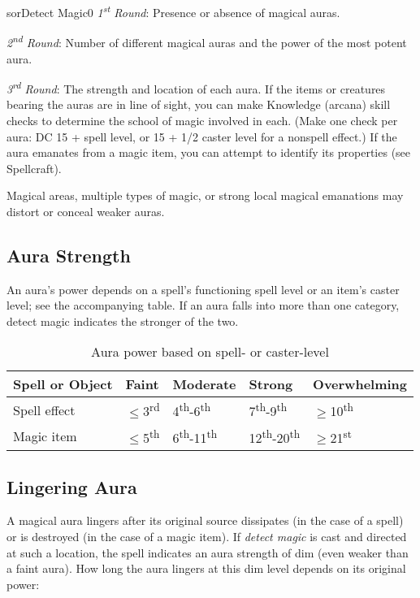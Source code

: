 \begin{spellcard}{sor}{Detect Magic}{0}
  \emph{1\textsuperscript{st} Round}:
  Presence or absence of magical auras.

  \emph{2\textsuperscript{nd} Round}:
  Number of different magical auras and the power of the most potent aura.

  \emph{3\textsuperscript{rd} Round}:
  The strength and location of each aura.
  If the items or creatures bearing the auras are in line of sight,
  you can make Knowledge (arcana) skill checks to determine the school of magic involved in each.
  (Make one check per aura: DC 15 + spell level, or 15 + 1/2 caster level for a nonspell effect.)
  If the aura emanates from a magic item, you can attempt to identify its properties (see Spellcraft).

  Magical areas, multiple types of magic,
  or strong local magical emanations may distort or conceal weaker auras.

  \subsection*{Aura Strength}
  An aura's power depends on a spell's functioning spell level or an item's caster level;
  see the accompanying table.
  If an aura falls into more than one category, detect magic indicates the stronger of the two.

  \begin{longtable}[]{@{}lllll@{}}
    \caption{Aura power based on spell- or caster-level}                                                                                                                                                          \\
    \toprule
    Spell or Object & Faint                           & Moderate                                     & Strong                                        & Overwhelming \tabularnewline\midrule
    \endhead{}
    Spell effect    & \(\leq{}\)3\textsuperscript{rd} & 4\textsuperscript{th}-6\textsuperscript{th}  & 7\textsuperscript{th}-9\textsuperscript{th}   & \(\geq{}\)10\textsuperscript{th}\tabularnewline{}
    Magic item      & \(\leq{}\)5\textsuperscript{th} & 6\textsuperscript{th}-11\textsuperscript{th} & 12\textsuperscript{th}-20\textsuperscript{th} & \(\geq{}\)21\textsuperscript{st}\tabularnewline\bottomrule
  \end{longtable}

  \subsection*{Lingering Aura}
  A magical aura lingers after its original source dissipates (in the case of a spell)
  or is destroyed (in the case of a magic item).
  If \emph{detect magic} is cast and directed at such a location,
  the spell indicates an aura strength of dim (even weaker than a faint aura).
  How long the aura lingers at this dim level depends on its original power:


\end{spellcard}
